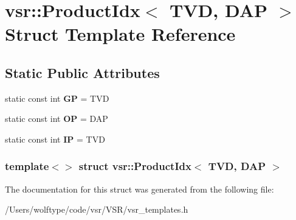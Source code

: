 \hypertarget{structvsr_1_1_product_idx_3_01_t_v_d_00_01_d_a_p_01_4}{\section{vsr\-:\-:Product\-Idx$<$ T\-V\-D, D\-A\-P $>$ Struct Template Reference}
\label{structvsr_1_1_product_idx_3_01_t_v_d_00_01_d_a_p_01_4}
}
\subsection*{Static Public Attributes}
\begin{DoxyCompactItemize}
\item 
\hypertarget{structvsr_1_1_product_idx_3_01_t_v_d_00_01_d_a_p_01_4_aa538b757548308a1f908936aeb8486a4}{static const int {\bfseries G\-P} = T\-V\-D}\label{structvsr_1_1_product_idx_3_01_t_v_d_00_01_d_a_p_01_4_aa538b757548308a1f908936aeb8486a4}

\item 
\hypertarget{structvsr_1_1_product_idx_3_01_t_v_d_00_01_d_a_p_01_4_a3d4451186cca7c500c2c982693b3f1f0}{static const int {\bfseries O\-P} = D\-A\-P}\label{structvsr_1_1_product_idx_3_01_t_v_d_00_01_d_a_p_01_4_a3d4451186cca7c500c2c982693b3f1f0}

\item 
\hypertarget{structvsr_1_1_product_idx_3_01_t_v_d_00_01_d_a_p_01_4_a75fd607d07de89c363b6425512f7fc43}{static const int {\bfseries I\-P} = T\-V\-D}\label{structvsr_1_1_product_idx_3_01_t_v_d_00_01_d_a_p_01_4_a75fd607d07de89c363b6425512f7fc43}

\end{DoxyCompactItemize}
\subsubsection*{template$<$$>$ struct vsr\-::\-Product\-Idx$<$ T\-V\-D, D\-A\-P $>$}



The documentation for this struct was generated from the following file\-:\begin{DoxyCompactItemize}
\item 
/\-Users/wolftype/code/vsr/\-V\-S\-R/vsr\-\_\-templates.\-h\end{DoxyCompactItemize}
